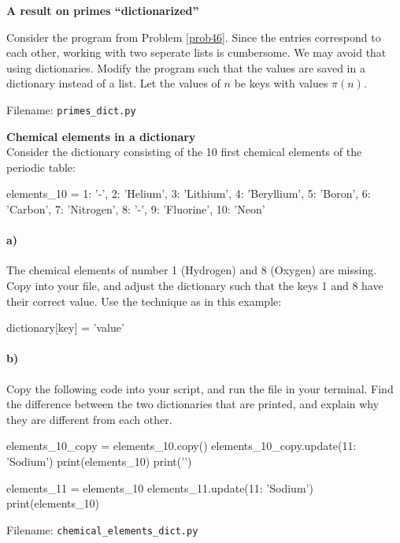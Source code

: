 
\begin{Problem}{\textbf{A result on primes ``dictionarized''}} \label{prob61}

\noindent Consider the program from Problem \ref{prob46}. Since the entries correspond to each other,
working with two seperate lists is cumbersome. We may avoid that using dictionaries.
Modify the program such that the values are saved in a dictionary instead of a list.
Let the values of $n$ be keys with values $\pi(n)$.

Filename: \texttt{primes\_dict.py}
\end{Problem}

\begin{Problem}\textbf{Chemical elements in a dictionary}
\noindent\\
Consider the dictionary  consisting of the 10 first chemical elements of the periodic table:
\begin{python}
elements_10 = {1: '-', 2: 'Helium', 3: 'Lithium', 
         4: 'Beryllium', 5: 'Boron', 6: 'Carbon', 
         7: 'Nitrogen', 8: '-',
         9: 'Fluorine', 10: 'Neon'}
\end{python}
\paragraph{a)}
The chemical elements of number 1 (Hydrogen) and 8 (Oxygen) are missing. Copy  into your file, and adjust the dictionary such that the keys 1 and 8 have their correct value. Use the technique as in this example:
\begin{python}
dictionary[key] = 'value'
\end{python}
\paragraph{b)} 
Copy the following code into your script, and run the file in your terminal. Find the difference between the two dictionaries that are printed, and explain why they are different from each other.
\begin{python}
elements_10_copy = elements_10.copy()
elements_10_copy.update({11: 'Sodium'})
print(elements_10)
print('\n')

elements_11 = elements_10
elements_11.update({11: 'Sodium'})
print(elements_10)
\end{python}

Filename: \texttt{chemical\_elements\_dict.py}
\end{Problem}
\newpage

